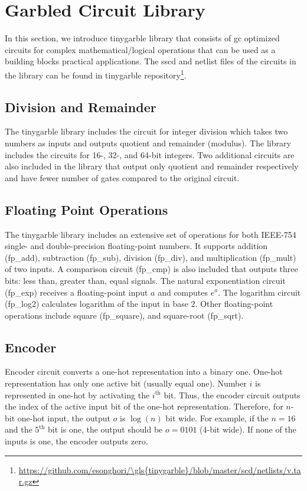 \chapter{Garbled Circuit Library}\label{chap:library}
In this section, we introduce \gls{tinygarble} library that consists of \acrshort{gc} optimized circuits for complex mathematical/logical operations that can be used as a building blocks practical applications.
The \acrshort{sscd} and \gls{netlist} files of the circuits in the library can be found in \gls{tinygarble} repository\footnote{\url{https://github.com/esonghori/\gls{tinygarble}/blob/master/scd/netlists/v.tar.gz}}.

\section{Division and Remainder}
The \gls{tinygarble} library includes the circuit for integer division which takes two numbers as inputs and outputs quotient and remainder (modulus).
The library includes the circuits for 16-, 32-, and 64-bit integers.
Two additional circuits are also included in the library that output only quotient and remainder respectively and have fewer number of gates compared to the original circuit.

\section{Floating Point Operations}
The \gls{tinygarble} library includes an extensive set of operations for both IEEE-754 single- and double-precision floating-point numbers.
It supports addition (fp\_add), subtraction (fp\_sub), division (fp\_div), and multiplication (fp\_mult) of two inputs.
A comparison circuit (fp\_cmp) is also included that outputs three bits: less than, greater than, equal signals.
The natural exponentiation circuit (fp\_exp) receives a floating-point input $a$ and computes $e^a$.
The logarithm circuit (fp\_log2) calculates logarithm of the input in base 2.
Other floating-point operations include square (fp\_square), and square-root (fp\_sqrt).

\section{Encoder}
Encoder circuit converts a one-hot representation into a binary one.
One-hot representation has only one active bit (usually equal one).
Number $i$ is represented in one-hot by activating the $i^{\text{th}}$ bit.
Thus, the encoder circuit outputs the index of the active input bit of the one-hot representation.
Therefore, for $n$-bit one-hot input, the output $o$ is $\log(n)$ bit wide.
For example, if the $n=16$ and the $5^{\text{th}}$ bit is one, the output should be $o=0101$ (4-bit wide).
If none of the inputs is one, the encoder outputs zero.

